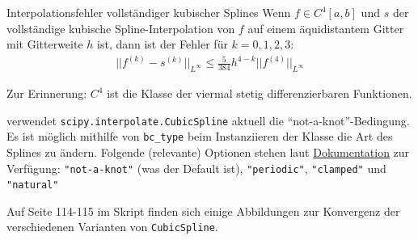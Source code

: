 \begin{theorem}[]{Interpolationsfehler vollständiger kubischer Splines}
    Wenn $f \in C^4[a, b]$ und $s$ der vollständige kubische Spline-Interpolation von $f$ auf einem äquidistantem Gitter mit Gitterweite $h$ ist, 
    dann ist der Fehler für $k = 0, 1, 2, 3$:
    \begin{align*}
        ||f^{(k)} - s^{(k)}||_{L^\infty} \leq \frac{5}{384} h^{4 - k} ||f^{(4)}||_{L^\infty}
    \end{align*}
\end{theorem}
Zur Erinnerung: $C^4$ ist die Klasse der viermal stetig differenzierbaren Funktionen.

\innumpy verwendet \texttt{scipy.interpolate.CubicSpline} aktuell die ``not-a-knot''-Bedingung. 
Es ist möglich mithilfe von \texttt{bc\_type} beim Instanziieren der Klasse die Art des Splines zu ändern.
Folgende (relevante) Optionen stehen laut 
\color{NavyBlue}\href{https://docs.scipy.org/doc/scipy/reference/generated/scipy.interpolate.CubicSpline.html}{Dokumentation}\color{black}\smallhspace
zur Verfügung: \texttt{"not-a-knot"} (was der Default ist), \texttt{"periodic"}, \texttt{"clamped"} und \texttt{"natural"}

Auf Seite 114-115 im Skript finden sich einige Abbildungen zur Konvergenz der verschiedenen Varianten von \texttt{CubicSpline}.
